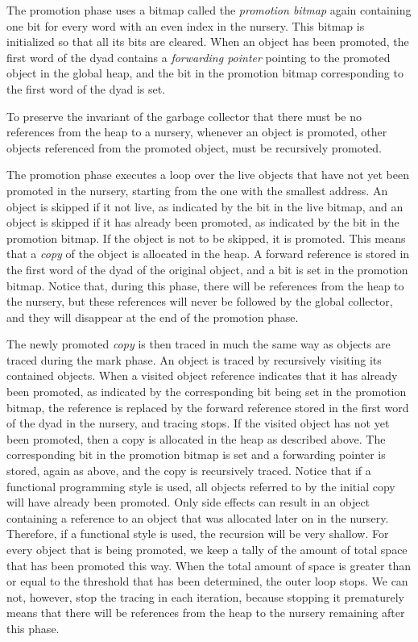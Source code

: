 The promotion phase uses a bitmap called the \emph{promotion bitmap}
again containing one bit for every word with an even index in the
nursery.  This bitmap is initialized so that all its bits are cleared.
When an object has been promoted, the first word of the dyad contains
a \emph{forwarding pointer} pointing to the promoted object in the
global heap, and the bit in the promotion bitmap corresponding to the
first word of the dyad is set.

To preserve the invariant of the garbage collector that there must be
no references from the heap to a nursery, whenever an object is
promoted, other objects referenced from the promoted object, must be
recursively promoted.

The promotion phase executes a loop over the live objects that have
not yet been promoted in the nursery, starting from the one with the
smallest address.  An object is skipped if it not live, as indicated
by the bit in the live bitmap, and an object is skipped if it has
already been promoted, as indicated by the bit in the promotion
bitmap.  If the object is not to be skipped, it is promoted.  This
means that a \emph{copy} of the object is allocated in the
heap.  A forward reference is stored in the first word of the dyad of
the original object, and a bit is set in the promotion bitmap.  Notice
that, during this phase, there will be references from the heap
to the nursery, but these references will never be followed by the
global collector, and they will disappear at the end of the promotion
phase.

The newly promoted \emph{copy} is then traced in much the same way as
objects are traced during the mark phase.  An object is traced by
recursively visiting its contained objects.  When a visited object
reference indicates that it has already been promoted, as indicated by
the corresponding bit being set in the promotion bitmap, the reference
is replaced by the forward reference stored in the first word of the
dyad in the nursery, and tracing stops.  If the visited object has
not yet been promoted, then a copy is allocated in the heap as
described above.  The corresponding bit in the promotion bitmap is set
and a forwarding pointer is stored, again as above, and the copy is
recursively traced.  Notice that if a functional programming style is
used, all objects referred to by the initial copy will have already
been promoted.  Only side effects can result in an object containing a
reference to an object that was allocated later on in the nursery.
Therefore, if a functional style is used, the recursion will be very
shallow.  For every object that is being promoted, we keep a tally of
the amount of total space that has been promoted this way.  When the
total amount of space is greater than or equal to the threshold that
has been determined, the outer loop stops.  We can not, however, stop
the tracing in each iteration, because stopping it prematurely means
that there will be references from the heap to the nursery
remaining after this phase.

